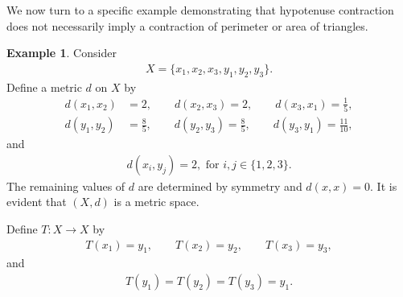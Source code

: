 \documentclass[11pt,reqno,a4paper]{amsart}
\theoremstyle{plain}
\theoremstyle{definition}
\newtheorem{example}[theorem]{Example}
\theoremstyle{remark}
\numberwithin{equation}{section}
\begin{document}

We now turn to a specific example demonstrating that hypotenuse contraction  does not necessarily imply a contraction of perimeter or area of triangles.
\begin{example}
Consider 
\begin{align*}
    X=\{x_1,x_2,x_3,y_1,y_2,y_3\}.
\end{align*}
Define a metric $d$ on $X$ by
\begin{align*}
d(x_1,x_2)&=2,\qquad
d(x_2,x_3)=2,\qquad
d(x_3,x_1)=\frac{1}{5},\\
d(y_1,y_2)&=\frac{8}{5},\qquad
d(y_2,y_3)=\frac{8}{5},\qquad
d(y_3,y_1)=\frac{11}{10},
\end{align*}
and
\begin{align*}
    d(x_i,y_j)=2, \text{ for } i,j\in\{1,2,3\}.
\end{align*}
The remaining values of $d$ are determined by symmetry and $d(x,x)=0$. It is evident that $(X,d)$ is a metric space.

Define $T:X\to X$ by
\begin{align*}
T(x_1)=y_1,\qquad
T(x_2)=y_2,\qquad
T(x_3)=y_3, 
\end{align*}
and
\begin{align*}
    T(y_1)=T(y_2)=T(y_3)=y_1.
\end{align*}



\end{example}
\end{document}
